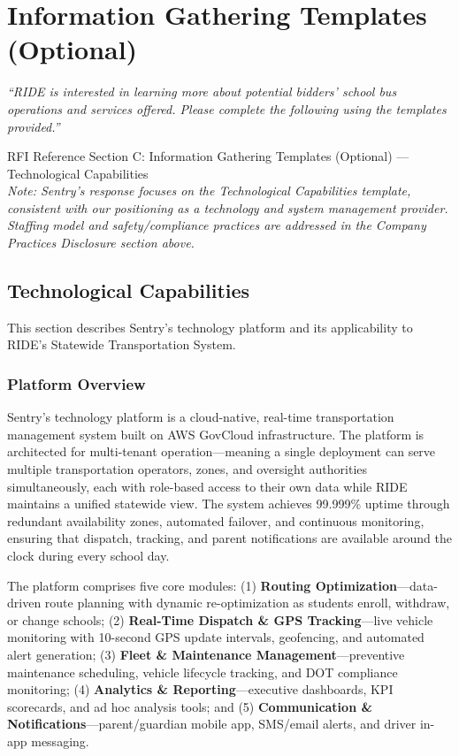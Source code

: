 \section{\texorpdfstring{\color{MidnightBlue}Information Gathering Templates (Optional)}{Information Gathering Templates (Optional)}}

\textit{``RIDE is interested in learning more about potential bidders' school bus operations and services offered. Please complete the following using the templates provided.''}

\begin{sidebar}{RFI Reference}
Section C: Information Gathering Templates (Optional) --- Technological Capabilities\\[0.3cm]
\textit{Note: Sentry's response focuses on the Technological Capabilities template, consistent with our positioning as a technology and system management provider. Staffing model and safety/compliance practices are addressed in the Company Practices Disclosure section above.}
\end{sidebar}

\subsection{Technological Capabilities}

This section describes Sentry's technology platform and its applicability to RIDE's Statewide Transportation System.

\subsubsection{Platform Overview}

Sentry's technology platform is a cloud-native, real-time transportation management system built on AWS GovCloud infrastructure. The platform is architected for multi-tenant operation---meaning a single deployment can serve multiple transportation operators, zones, and oversight authorities simultaneously, each with role-based access to their own data while RIDE maintains a unified statewide view. The system achieves 99.999\% uptime through redundant availability zones, automated failover, and continuous monitoring, ensuring that dispatch, tracking, and parent notifications are available around the clock during every school day.

The platform comprises five core modules: (1) \textbf{Routing Optimization}---data-driven route planning with dynamic re-optimization as students enroll, withdraw, or change schools; (2) \textbf{Real-Time Dispatch \& GPS Tracking}---live vehicle monitoring with 10-second GPS update intervals, geofencing, and automated alert generation; (3) \textbf{Fleet \& Maintenance Management}---preventive maintenance scheduling, vehicle lifecycle tracking, and DOT compliance monitoring; (4) \textbf{Analytics \& Reporting}---executive dashboards, KPI scorecards, and ad hoc analysis tools; and (5) \textbf{Communication \& Notifications}---parent/guardian mobile app, SMS/email alerts, and driver in-app messaging.

